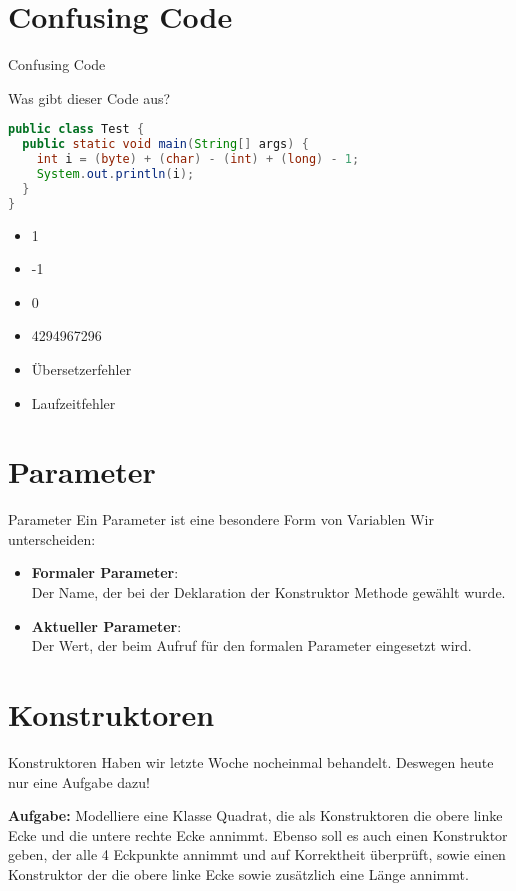 \documentclass[18pt]{beamer}
\begin{document}
\section{Confusing Code}
\begin{frame}[fragile]{Confusing Code}
\begin{exampleblock}{Was gibt dieser Code aus?}
\begin{lstlisting}[language=java]
public class Test {
  public static void main(String[] args) {
    int i = (byte) + (char) - (int) + (long) - 1;
    System.out.println(i);
  }
}
\end{lstlisting}
\end{exampleblock}
\begin{itemize}
 \item 1
 \item -1
 \item 0
 \item 4294967296
 \item Übersetzerfehler
 \item Laufzeitfehler
\end{itemize}
\end{frame}


\section{Parameter}
\begin{frame}{Parameter}
Ein Parameter ist eine besondere Form von Variablen
Wir unterscheiden:
\begin{itemize}
 \item \textbf{Formaler Parameter}: \pause \\
  Der Name, der bei der Deklaration der Konstruktor Methode gewählt wurde.
  
 \item \textbf{Aktueller Parameter}:\pause \\
 Der Wert, der beim Aufruf für den formalen Parameter eingesetzt wird.
\end{itemize}
\end{frame}


\section{Konstruktoren}
\begin{frame}{Konstruktoren}
 Haben wir letzte Woche nocheinmal behandelt.
 Deswegen heute nur eine Aufgabe dazu!
 
 \textbf{Aufgabe:} Modelliere eine Klasse Quadrat, die als Konstruktoren die obere linke Ecke und die untere rechte Ecke annimmt.
 Ebenso soll es auch einen Konstruktor geben, der alle 4 Eckpunkte annimmt und auf Korrektheit überprüft, sowie einen Konstruktor
 der die obere linke Ecke sowie zusätzlich eine Länge annimmt.
\end{frame}
\end{document}
